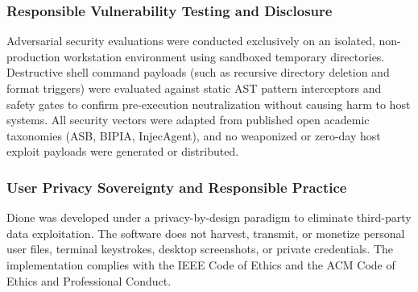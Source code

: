 \documentclass[conference,a4paper]{IEEEtran}
\begin{document}
\subsubsection{Responsible Vulnerability Testing and Disclosure}
Adversarial security evaluations were conducted exclusively on an isolated, non-production workstation environment using sandboxed temporary directories. Destructive shell command payloads (such as recursive directory deletion and format triggers) were evaluated against static AST pattern interceptors and safety gates to confirm pre-execution neutralization without causing harm to host systems. All security vectors were adapted from published open academic taxonomies (ASB, BIPIA, InjecAgent), and no weaponized or zero-day host exploit payloads were generated or distributed.

\subsubsection{User Privacy Sovereignty and Responsible Practice}
Dione was developed under a privacy-by-design paradigm to eliminate third-party data exploitation. The software does not harvest, transmit, or monetize personal user files, terminal keystrokes, desktop screenshots, or private credentials. The implementation complies with the IEEE Code of Ethics and the ACM Code of Ethics and Professional Conduct.
\end{document}
